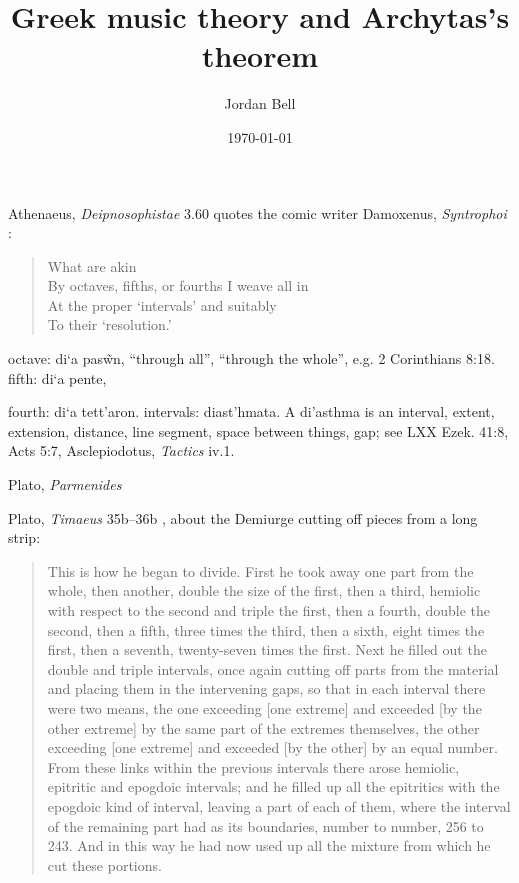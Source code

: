 \documentclass{amsart}
\newcommand{\textgreek}[1]{\begingroup\fontencoding{LGR}\selectfont#1\endgroup}
\theoremstyle{definition}
\begin{document}
\title{Greek music theory and Archytas's theorem}
\author{Jordan Bell}
\address{Department of Mathematics, University of Toronto, Toronto, Ontario, Canada}
\date{\today}

\maketitle

Athenaeus, {\em Deipnosophistae} 3.60 quotes the comic writer Damoxenus, {\em Syntrophoi} \cite[p.~215]{edmonds}:

\begin{quote}
What are akin\\
By octaves, fifths, or fourths I weave all in\\
At the proper `intervals' and suitably\\
To their `resolution.'
\end{quote}

octave: \textgreek{di`a pas\~wn},  ``through all'', ``through the whole'', e.g. 2 Corinthians 8:18. fifth: \textgreek{di`a pente},

fourth: \textgreek{di`a tett'aron}. intervals:
\textgreek{diast'hmata}. A \textgreek{di'asthma} is an interval, extent, extension, distance, line segment, space between things, gap; see LXX Ezek. 41:8, Acts 5:7,
Asclepiodotus, {\em Tactics} iv.1.

Plato, {\em Parmenides} \cite[p.~38]{allen}

Plato, {\em Timaeus} 35b--36b \cite[pp.~59--60]{barker}, about the Demiurge cutting off pieces from a long strip:

\begin{quote}
This is how he began to divide. First he took away one part from the
whole, then another, double the size of the first, then a third, hemiolic with
respect to the second and triple the first, then a fourth, double the second, then
a fifth, three times the third, then a sixth, eight times the first, then a seventh,
twenty-seven times the first. Next he filled out the double and triple intervals,
once again cutting off parts from the material and placing them in the
intervening gaps, so that in each interval there were two means, the one
exceeding [one extreme] and exceeded [by the other extreme] by the same part
of the extremes themselves, the other exceeding [one extreme] and exceeded [by
the other] by an equal number. From these links within the previous intervals
there arose hemiolic, epitritic and epogdoic intervals; and he filled up all the
epitritics with the epogdoic kind of interval, leaving a part of each of them,
where the interval of the remaining part had as its boundaries, number to
number, 256 to 243. And in this way he had now used up all the mixture from
which he cut these portions.
\end{quote}
\end{document}
